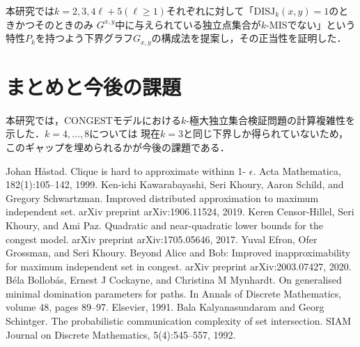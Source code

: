\documentclass[a4j,twoside]{jarticle}
\newcommand{\CONGEST}{\textsf{CONGEST}}
\theoremstyle{definition}
\begin{document}
\begin{論文概要}
本研究では$k=2, 3, 4\ell+5(\ell \geq 1)$それぞれに対して「$\mathrm{DISJ}_{k} (x, y)=1$のときかつそのときのみ
$G^{x,y}$中に与えられている独立点集合が$k$-MISでない」という特性$P_{k}$を持つよう下界グラフ$G_{x,y}$の構成法を提案し，その正当性を証明した．
\section{まとめと今後の課題}
本研究では，{\CONGEST}モデルにおける$k$-極大独立集合検証問題の計算複雑性を示した．$k=4, \ldots, 8$については
現在$k=3$と同じ下界しか得られていないため，このギャップを埋められるかが今後の課題である．


\begin{thebibliography}{6}
     Johan H{\aa}stad. Clique is hard to approximate withinn 1- $\epsilon$. Acta Mathematica, 182(1):105–142, 1999.
     Ken-ichi Kawarabayashi, Seri Khoury, Aaron Schild, and Gregory Schwartzman.
Improved distributed approximation to maximum independent set. arXiv preprint arXiv:1906.11524, 2019.
     Keren Censor-Hillel, Seri Khoury, and Ami Paz. Quadratic and near-quadratic lower
bounds for the congest model. arXiv preprint arXiv:1705.05646, 2017.
     Yuval Efron, Ofer Grossman, and Seri Khoury. Beyond Alice and Bob: Improved
inapproximability for maximum independent set in congest. arXiv preprint arXiv:2003.07427, 2020.
     B{\'e}la Bollob{\'a}s, Ernest J Cockayne, and Christina M Mynhardt. On generalised minimal
domination parameters for paths. In Annals of Discrete Mathematics, volume 48, pages 89–97. Elsevier, 1991.
     Bala Kalyanasundaram and Georg Schintger. The probabilistic communication complexity
of set intersection. SIAM Journal on Discrete Mathematics, 5(4):545–557,
1992.
\end{thebibliography}
%
%

\clearpage
\end{論文概要}
\end{document}
